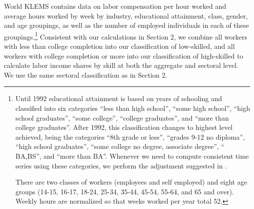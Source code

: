 \documentclass[12pt,english]{article}
\begin{document}
{\normalsize World KLEMS contains data on labor compensation per hour worked
and average hours worked by week by industry, educational attainment, class,
gender, and age groupings, as well as the number of employed individuals in
each of these groupings.\footnote{%
Until 1992 educational attainment is based on years of schooling and
classified into six categories \textquotedblleft less than high
school\textquotedblright , \textquotedblleft some high
school\textquotedblright , \textquotedblleft high school
graduates\textquotedblright , \textquotedblleft some
college\textquotedblright , \textquotedblleft college
graduates\textquotedblright , and \textquotedblleft more than college
graduates\textquotedblright . After 1992, this classification changes to
highest level achieved, being the categories \textquotedblleft 8th grade or
less\textquotedblright , \textquotedblleft grades 9-12 no
diploma\textquotedblright , \textquotedblleft high school
graduates\textquotedblright , \textquotedblleft some college no degree,
associate degree\textquotedblright , \textquotedblleft
BA,BS\textquotedblright , and \textquotedblleft more than
BA\textquotedblright . Whenever we need to compute consistent time series
using these categories, we perform the adjustment suggested in \citet{Jae97}.
\par
There are two classes of workers (employees and self employed) and eight age
groups (14-15, 16-17, 18-24, 25-34, 35-44, 45-54, 55-64, and 65 and over).
Weekly hours are normalized so that weeks worked per year total 52.}
Consistent with our calculations in Section 2, we combine all workers with
less than college completion into our classification of low-skilled, and all
workers with college completion or more into our classification of
high-skilled to calculate labor income shares by skill at both the aggregate
and sectoral level. We use the same sectoral classification as in Section 2. 
}
\end{document}
